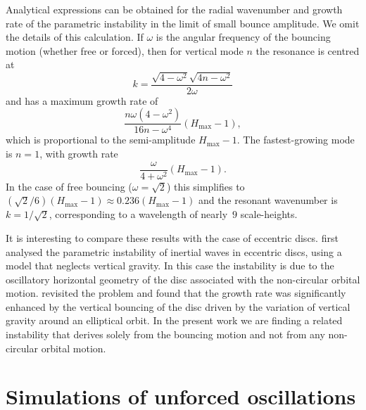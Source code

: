 \documentclass[fleqn,usenatbib]{mnras}
\begin{document}
Analytical expressions can be obtained for the radial wavenumber and growth rate of the parametric instability in the limit of small bounce amplitude. We omit the details of this calculation. If $\omega$ is the angular frequency of the bouncing motion (whether free or forced), then for vertical mode $n$ the resonance is centred at
\begin{equation}
  k=\frac{\sqrt{4-\omega^2}\sqrt{4n-\omega^2}}{2\omega}
\end{equation}
and has a maximum growth rate of
\begin{equation}
  \frac{n\omega(4-\omega^2)}{16n-\omega^4}(H_\text{max}-1),
\end{equation}
which is proportional to the semi-amplitude $H_\text{max}-1$. The fastest-growing mode is $n=1$, with growth rate
\begin{equation}
  \frac{\omega}{4+\omega^2}(H_\text{max}-1).
\end{equation}
In the case of free bouncing ($\omega=\sqrt{2}$) this simplifies to $(\sqrt{2}/6)(H_\text{max}-1)\approx0.236(H_\text{max}-1)$ and the resonant wavenumber is $k=1/\sqrt{2}$, corresponding to a wavelength of nearly~$9$ scale-heights.

It is interesting to compare these results with the case of eccentric discs. \cite{papaloizou2005local} first analysed the parametric instability of inertial waves in eccentric discs, using a model that neglects vertical gravity. In this case the instability is due to the oscillatory horizontal geometry of the disc associated with the non-circular orbital motion. \cite{barker2014hydrodynamic} revisited the problem and found that the growth rate was significantly enhanced by the vertical bouncing of the disc driven by the variation of vertical gravity around an elliptical orbit. In the present work we are finding a related instability that derives solely from the bouncing motion and not from any non-circular orbital motion.

\section{Simulations of unforced oscillations}
\label{RESULTS_FreeBounceSimulations}
\end{document}
